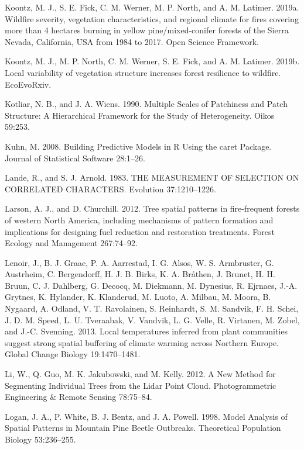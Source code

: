 \documentclass[twoside,12pt,final]{ucthesis-CA2012}
\begin{document}
\begin{ucmainmatter}
\hypertarget{ref-koontz2019}{}
Koontz, M. J., S. E. Fick, C. M. Werner, M. P. North, and A. M. Latimer.
2019a. Wildfire severity, vegetation characteristics, and regional
climate for fires covering more than 4 hectares burning in yellow
pine/mixed-conifer forests of the Sierra Nevada, California, USA from
1984 to 2017. Open Science Framework.

\hypertarget{ref-koontz2019a}{}
Koontz, M. J., M. P. North, C. M. Werner, S. E. Fick, and A. M. Latimer.
2019b. Local variability of vegetation structure increases forest
resilience to wildfire. EcoEvoRxiv.

\hypertarget{ref-kotliar1990}{}
Kotliar, N. B., and J. A. Wiens. 1990. Multiple Scales of Patchiness and
Patch Structure: A Hierarchical Framework for the Study of
Heterogeneity. Oikos 59:253.

\hypertarget{ref-kuhn2008}{}
Kuhn, M. 2008. Building Predictive Models in R Using the caret Package.
Journal of Statistical Software 28:1--26.

\hypertarget{ref-lande1983}{}
Lande, R., and S. J. Arnold. 1983. THE MEASUREMENT OF SELECTION ON
CORRELATED CHARACTERS. Evolution 37:1210--1226.

\hypertarget{ref-larson2012}{}
Larson, A. J., and D. Churchill. 2012. Tree spatial patterns in
fire-frequent forests of western North America, including mechanisms of
pattern formation and implications for designing fuel reduction and
restoration treatments. Forest Ecology and Management 267:74--92.

\hypertarget{ref-lenoir2013}{}
Lenoir, J., B. J. Graae, P. A. Aarrestad, I. G. Alsos, W. S. Armbruster,
G. Austrheim, C. Bergendorff, H. J. B. Birks, K. A. Bråthen, J. Brunet,
H. H. Bruun, C. J. Dahlberg, G. Decocq, M. Diekmann, M. Dynesius, R.
Ejrnaes, J.-A. Grytnes, K. Hylander, K. Klanderud, M. Luoto, A. Milbau,
M. Moora, B. Nygaard, A. Odland, V. T. Ravolainen, S. Reinhardt, S. M.
Sandvik, F. H. Schei, J. D. M. Speed, L. U. Tveraabak, V. Vandvik, L. G.
Velle, R. Virtanen, M. Zobel, and J.-C. Svenning. 2013. Local
temperatures inferred from plant communities suggest strong spatial
buffering of climate warming across Northern Europe. Global Change
Biology 19:1470--1481.

\hypertarget{ref-li2012}{}
Li, W., Q. Guo, M. K. Jakubowski, and M. Kelly. 2012. A New Method for
Segmenting Individual Trees from the Lidar Point Cloud. Photogrammetric
Engineering \& Remote Sensing 78:75--84.

\hypertarget{ref-logan1998}{}
Logan, J. A., P. White, B. J. Bentz, and J. A. Powell. 1998. Model
Analysis of Spatial Patterns in Mountain Pine Beetle Outbreaks.
Theoretical Population Biology 53:236--255.


\end{ucmainmatter}
\end{document}
